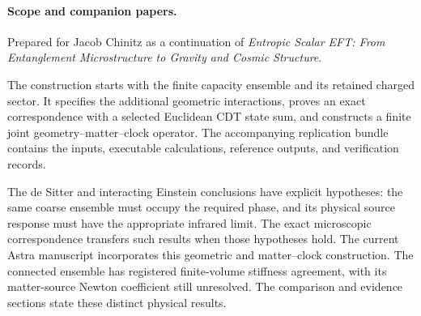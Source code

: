 \documentclass[11pt]{article}
\theoremstyle{remark}
\numberwithin{equation}{section}
\begin{document}
\clearpage
{\small\tableofcontents}
\clearpage
\paragraph{Scope and companion papers.}
Prepared for Jacob Chinitz as a continuation of \emph{Entropic Scalar EFT: From Entanglement Microstructure to Gravity and Cosmic Structure}.

The construction starts with the finite capacity ensemble and its retained charged sector. It specifies the additional geometric interactions, proves an exact correspondence with a selected Euclidean CDT state sum, and constructs a finite joint geometry--matter--clock operator. The accompanying replication bundle contains the inputs, executable calculations, reference outputs, and verification records.

The de Sitter and interacting Einstein conclusions have explicit hypotheses: the same coarse ensemble must occupy the required phase, and its physical source response must have the appropriate infrared limit. The exact microscopic correspondence transfers such results when those hypotheses hold.
The current Astra manuscript incorporates this geometric and matter--clock construction. The connected ensemble has registered finite-volume stiffness agreement, with its matter-source Newton coefficient still unresolved. The comparison and evidence sections state these distinct physical results.
\end{document}
